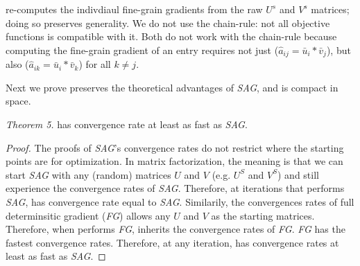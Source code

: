 \tool re-computes the indivdiaul fine-grain gradients from the raw $U^{s}$ and $V^{s}$ matrices; doing so preserves generality.
We do not use the chain-rule: not all objective functions is compatible with it.
Both \cite{climf, bpr} do not work with the chain-rule because computing the fine-grain gradient of an entry requires not just ($\hat{a}_{ij} = \bar{u}_{i}*\bar{v}_{j}$), 
but also ($\hat{a}_{ik} = \bar{u}_{i}*\bar{v}_{k}$) for all $k \neq j$.


Next we prove \tool preserves the theoretical advantages of \emph{SAG}, and \tool is compact in space.

\emph{Theorem 5.}
\tool has convergence rate at least as fast as \emph{SAG}.
\begin{proof}
The proofs of \emph{SAG}'s convergence rates \cite{schmidt2013minimizing, roux2012stochastic} do not restrict where the starting points are for optimization.
In matrix factorization, the meaning is that we can start \emph{SAG} with any (random) matrices $U$ and $V$ (e.g. $U^{S}$ and $V^{S}$)
and still experience the convergence rates of \emph{SAG}.
Therefore, at iterations that \tool performs \emph{SAG}, \tool has convergence rate equal to \emph{SAG}.
Similarily, the convergences rates of full determinsitic gradient (\emph{FG}) allows any $U$ and $V$ as the starting matrices.
Therefore, when \tool performs \emph{FG}, \tool inherits the convergence rates of \emph{FG}.
\emph{FG} has the fastest convergence rates.
Therefore, at any iteration, \tool has convergence rates at least as fast as \emph{SAG}.
\end{proof}


